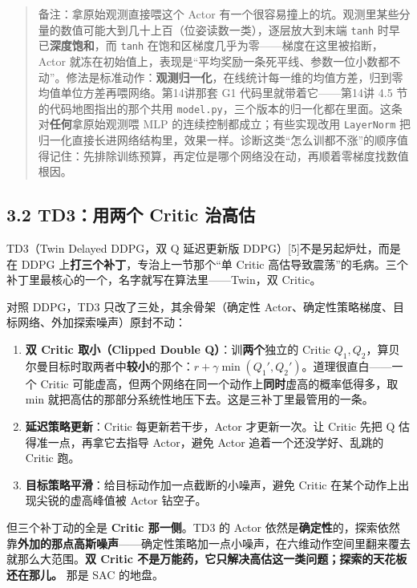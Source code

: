 \documentclass[
  chinese,
]{ctexart}
\providecommand{\tightlist}{%
  \setlength{\itemsep}{0pt}\setlength{\parskip}{0pt}}
\begin{document}
\begin{quote}
备注：拿原始观测直接喂这个 Actor
有一个很容易撞上的坑。观测里某些分量的数值可能大到几十上百（位姿读数一类），逐层放大到末端
\texttt{tanh} 时早已\textbf{深度饱和}，而 \texttt{tanh}
在饱和区梯度几乎为零------梯度在这里被掐断，Actor
就冻在初始值上，表现是``平均奖励一条死平线、参数一位小数都不动''。修法是标准动作：\textbf{观测归一化}，在线统计每一维的均值方差，归到零均值单位方差再喂网络。第14讲那套
G1 代码里就带着它------第14讲 4.5 节的代码地图指出的那个共用
\texttt{model.py}，三个版本的归一化都在里面。这条对\textbf{任何}拿原始观测喂
MLP 的连续控制都成立；有些实现改用 \texttt{LayerNorm}
把归一化直接长进网络结构里，效果一样。诊断这类``怎么训都不涨''的顺序值得记住：先排除训练预算，再定位是哪个网络没在动，再顺着零梯度找数值根因。
\end{quote}

\subsection{3.2 TD3：用两个 Critic
治高估}\label{td3ux7528ux4e24ux4e2a-critic-ux6cbbux9ad8ux4f30}

TD3（Twin Delayed DDPG，双 Q 延迟更新版
DDPG）{[}5{]}不是另起炉灶，而是在 DDPG
上\textbf{打三个补丁}，专治上一节那个``单 Critic
高估导致震荡''的毛病。三个补丁里最核心的一个，名字就写在算法里------Twin，双
Critic。

对照 DDPG，TD3 只改了三处，其余骨架（确定性
Actor、确定性策略梯度、目标网络、外加探索噪声）原封不动：

\begin{enumerate}
\def\labelenumi{\arabic{enumi}.}
\tightlist
\item
  \textbf{双 Critic 取小（Clipped Double Q）}：训\textbf{两个}独立的
  Critic
  \(Q_1, Q_2\)，算贝尔曼目标时取两者中\textbf{较小}的那个：\(r + \gamma \min(Q_1', Q_2')\)。道理很直白------一个
  Critic
  可能虚高，但两个网络在同一个动作上\textbf{同时}虚高的概率低得多，取
  min 就把高估的那部分系统性地压下去。这是三补丁里最管用的一条。
\item
  \textbf{延迟策略更新}：Critic 每更新若干步，Actor 才更新一次。让
  Critic 先把 Q 估得准一点，再拿它去指导 Actor，避免 Actor
  追着一个还没学好、乱跳的 Critic 跑。
\item
  \textbf{目标策略平滑}：给目标动作加一点截断的小噪声，避免 Critic
  在某个动作上出现尖锐的虚高峰值被 Actor 钻空子。
\end{enumerate}

但三个补丁动的全是 \textbf{Critic 那一侧}。TD3 的 Actor
依然是\textbf{确定性}的，探索依然靠\textbf{外加的那点高斯噪声}------确定性策略加一点小噪声，在六维动作空间里翻来覆去就那么大范围。\textbf{双
Critic 不是万能药，它只解决高估这一类问题；探索的天花板还在那儿。} 那是
SAC 的地盘。
\end{document}
